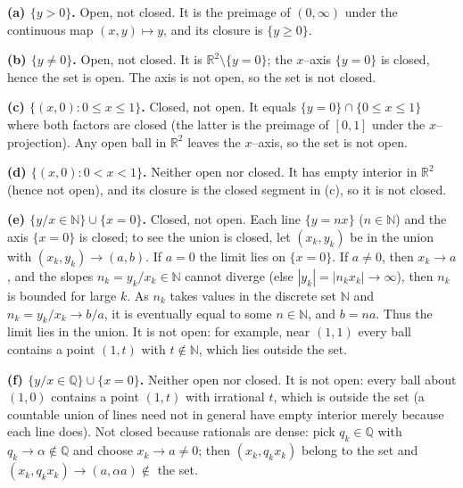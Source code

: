\begin{solution}
\par\medskip\noindent\textbf{(a) $\{y>0\}$.}\quad 
Open, not closed. It is the preimage of $(0,\infty)$ under the continuous map $(x,y)\mapsto y$, and its closure is $\{y\ge0\}$.

\par\medskip\noindent\textbf{(b) $\{y\ne0\}$.}\quad 
Open, not closed. It is $\mathbb{R}^2\setminus\{y=0\}$; the $x$--axis $\{y=0\}$ is closed, hence the set is open. The axis is not open, so the set is not closed.

\par\medskip\noindent\textbf{(c) $\{(x,0): 0\le x\le1\}$.}\quad 
Closed, not open. It equals $\{y=0\}\cap\{0\le x\le1\}$ where both factors are closed (the latter is the preimage of $[0,1]$ under the $x$--projection). Any open ball in $\mathbb{R}^2$ leaves the $x$--axis, so the set is not open.

\par\medskip\noindent\textbf{(d) $\{(x,0): 0<x<1\}$.}\quad 
Neither open nor closed. It has empty interior in $\mathbb{R}^2$ (hence not open), and its closure is the closed segment in (c), so it is not closed.

\par\medskip\noindent\textbf{(e) $\{y/x\in\mathbb{N}\}\cup\{x=0\}$.}\quad 
Closed, not open. Each line $\{y=nx\}$ ($n\in\mathbb{N}$) and the axis $\{x=0\}$ is closed; to see the union is closed, let $(x_k,y_k)$ be in the union with $(x_k,y_k)\to (a,b)$. If $a=0$ the limit lies on $\{x=0\}$. If $a\ne0$, then $x_k\to a$, and the slopes $n_k=y_k/x_k\in\mathbb{N}$ cannot diverge (else $|y_k|=|n_k x_k|\to\infty$), then $n_k$ is bounded for large $k$. As $n_k$ takes values in the discrete set $\mathbb N$ and $n_k=y_k/x_k\to b/a$, it is eventually equal to some $n\in\mathbb N$, and $b=na$. Thus the limit lies in the union. It is not open: for example, near $(1,1)$ every ball contains a point $(1,t)$ with $t\notin\mathbb N$, which lies outside the set.

\par\medskip\noindent\textbf{(f) $\{y/x\in\mathbb{Q}\}\cup\{x=0\}$.}\quad 
Neither open nor closed. It is not open: every ball about $(1,0)$ contains a point $(1,t)$ with irrational $t$, which is outside the set (a countable union of lines need not in general have empty interior merely because each line does). Not closed because rationals are dense: pick $q_k\in\mathbb{Q}$ with $q_k\to \alpha\notin\mathbb{Q}$ and choose $x_k\to a\ne0$; then $(x_k,q_k x_k)$ belong to the set and $(x_k,q_k x_k)\to (a,\alpha a)\notin$ the set.
\end{solution}

